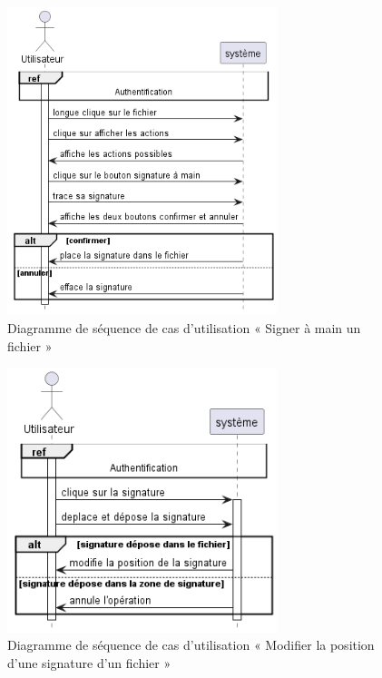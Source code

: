 \begin{figure}[H]
  \centering
  \includegraphics[width=0.7\textwidth]{out/diagrams/sprint4/sign_by_hand/sign_by_hand}
  \caption{Diagramme de séquence de cas d'utilisation « Signer à main un fichier   »}
  \label{fig:sequence_sign_by_hand}
\end{figure}
\begin{figure}[H]
  \centering
  \includegraphics[width=0.7\textwidth]{out/diagrams/sprint4/move_signature/move_signature}
  \caption{Diagramme de séquence de cas d'utilisation « Modifier la position d’une signature d’un fichier »}
  \label{fig:sequence_move_signature}
\end{figure}

